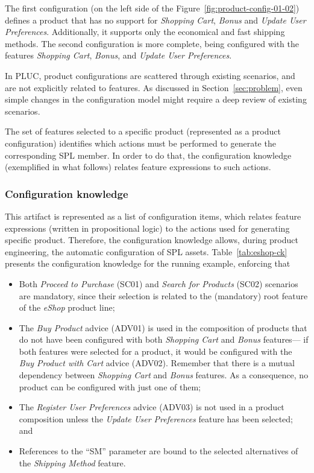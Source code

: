 The first configuration (on the left side of the
Figure~\ref{fig:product-config-01-02}) defines a product that has no support for
\emph{Shopping Cart}, \emph{Bonus} and \emph{Update User Preferences}.
Additionally, it supports only the economical and fast shipping methods. The
second configuration is more complete, being configured with the features
\emph{Shopping Cart}, \emph{Bonus}, and \emph{Update User Preferences}.

In PLUC, product configurations are scattered through existing scenarios, and
are not explicitly related to features. As discussed in
Section~\ref{sec:problem}, even simple changes in the configuration model might
require a deep review of existing scenarios. 

The set of features selected to a specific product (represented as a product
configuration) identifies which actions must be performed to
generate the corresponding SPL member. In order to do that, the configuration
knowledge (exemplified in what follows) relates feature expressions to such
actions. 

\subsubsection{Configuration knowledge}

This artifact is represented as a list of configuration items, which relates
feature expressions (written in propositional logic) to the actions used for
generating specific product. Therefore, the configuration knowledge allows,
during product engineering, the automatic configuration of SPL assets.
Table~\ref{tab:eshop-ck} presents the configuration
knowledge for the running example, enforcing that


\begin{itemize}
\item Both \emph{Proceed to Purchase} (SC01) and \emph{Search for Products}
(SC02) scenarios are mandatory, since their selection is related to the
(mandatory) root feature of the \emph{eShop} product line;

\item The \emph{Buy Product} advice (ADV01) is used in the composition of
products that do not have been configured with both \emph{Shopping Cart} and \emph{Bonus}
features--- if both features were selected for a product, it would be configured
with the \emph{Buy Product with Cart} advice (ADV02). Remember that there is a
mutual dependency between \emph{Shopping Cart} and \emph{Bonus} features. As a
consequence, no product can be configured with just one of them;

\item The \emph{Register User Preferences} advice (ADV03) is not used in a
product composition unless the \emph{Update User Preferences} feature has been
selected; and

\item References to the ``SM'' parameter are bound to the
selected alternatives of the \emph{Shipping Method} feature.

\end{itemize}


